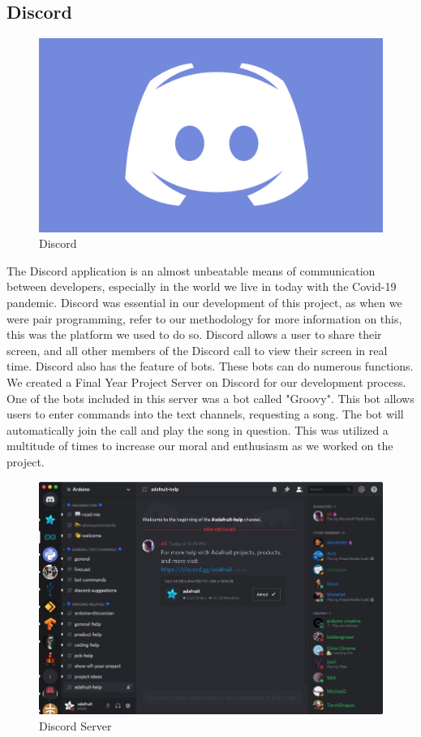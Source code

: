 \subsection{Discord}

\begin{figure}[hb]
\renewcommand\thefigure{3.17}
\centering
\includegraphics[scale=0.1]{img/discord-logo.jpg}
\caption{Discord}
\label{Discord}
\end{figure}
\par
The Discord application is an almost unbeatable means of communication between developers, especially in the world we live in today with the Covid-19 pandemic. Discord was essential in our development of this project, as when we were pair programming, refer to our methodology for more information on this, this was the platform we used to do so. Discord allows a user to share their screen, and all other members of the Discord call to view their screen in real time. Discord also has the feature of bots. These bots can do numerous functions. We created a Final Year Project Server on Discord for our development process. One of the bots included in this server was a bot called "Groovy". This bot allows users to enter commands into the text channels, requesting a song. The bot will automatically join the call and play the song in question. This was utilized a multitude of times to increase our moral and enthusiasm as we worked on the project. \par

\begin{figure}[h]
\renewcommand\thefigure{3.18}
\centering
\includegraphics[scale=0.5]{img/server.jpg}
\caption{Discord Server}
\label{DiscordServer}
\end{figure}

